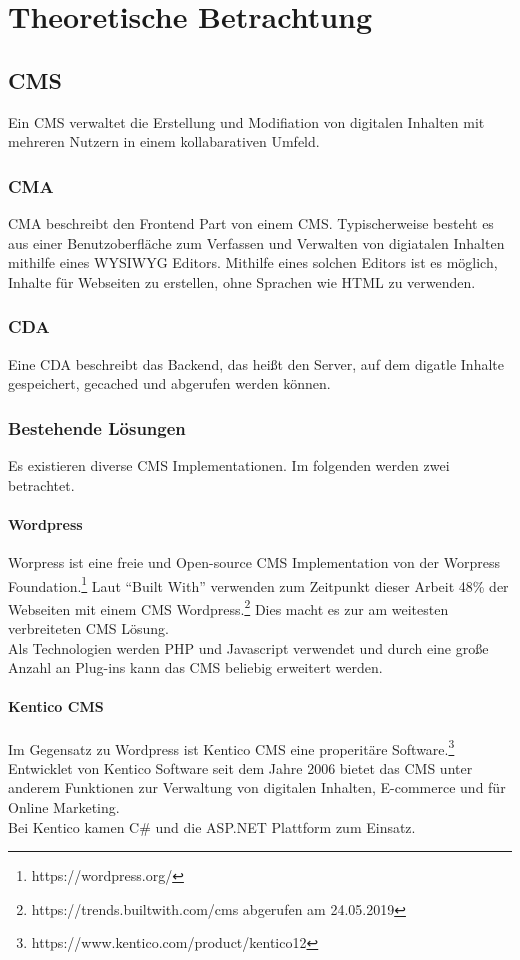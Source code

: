 \chapter{Theoretische Betrachtung}
\section{\acl{CMS}}
Ein \ac{CMS} verwaltet die Erstellung und Modifiation von digitalen Inhalten mit
mehreren Nutzern in einem kollabarativen Umfeld.
\subsection{\acl{CMA}}
\ac{CMA} beschreibt den Frontend Part von einem \ac{CMS}. Typischerweise besteht
es aus einer Benutzoberfläche zum Verfassen und Verwalten von digiatalen
Inhalten mithilfe eines \ac{WYSIWYG} Editors. Mithilfe eines solchen Editors ist
es möglich, Inhalte für Webseiten zu erstellen, ohne Sprachen wie \ac{HTML} zu verwenden.
\subsection{\acl{CDA}}
Eine \ac{CDA} beschreibt das Backend, das heißt den Server, auf dem digatle
Inhalte gespeichert, gecached und abgerufen werden können.
\subsection{Bestehende Lösungen}
Es existieren diverse \ac{CMS} Implementationen. Im folgenden werden
zwei betrachtet.
\subsubsection{Wordpress}
Worpress ist eine freie und Open-source \ac{CMS} Implementation von der Worpress
Foundation.\footnote{https://wordpress.org/} Laut ``Built With'' verwenden zum
Zeitpunkt dieser Arbeit 48\% der Webseiten mit einem \ac{CMS}
Wordpress.\footnote{https://trends.builtwith.com/cms abgerufen am 24.05.2019} Dies
macht es zur am weitesten verbreiteten \ac{CMS} Lösung.\\
Als Technologien werden PHP und Javascript verwendet und durch eine große Anzahl an Plug-ins kann das
\ac{CMS} beliebig erweitert werden.
\subsubsection{Kentico CMS}
Im Gegensatz zu Wordpress ist Kentico CMS eine properitäre Software.\footnote{https://www.kentico.com/product/kentico12} Entwicklet
von Kentico Software seit dem Jahre 2006 bietet das \ac{CMS} unter anderem Funktionen zur
Verwaltung von digitalen Inhalten, E-commerce und für Online Marketing.\\
Bei Kentico kamen C\# und die ASP.NET Plattform zum Einsatz.

